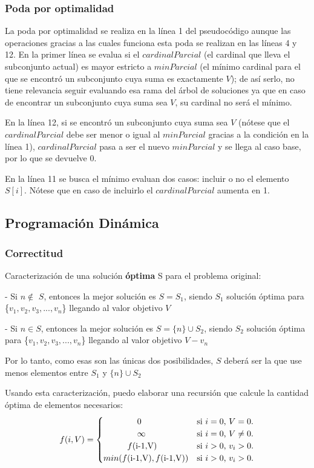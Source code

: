 \subsubsection{Poda por optimalidad}
\par La poda por optimalidad se realiza en la l\'inea 1 del pseudoc\'odigo aunque las operaciones gracias a las
cuales funciona esta poda se realizan en las l\'ineas 4 y 12. En la primer l\'inea se evalua si el $cardinalParcial$
(el cardinal que lleva el subconjunto actual) es mayor estricto a $minParcial$ (el m\'inimo cardinal para el que
se encontr\'o un subconjunto cuya suma es exactamente $V$); de as\'i serlo, no tiene relevancia seguir evaluando
esa rama del \'arbol de soluciones ya que en caso de encontrar un subconjunto cuya suma sea $V$, su cardinal no ser\'a
el m\'inimo.
\par En la l\'inea 12, si se encontr\'o un subconjunto cuya suma sea $V$ (n\'otese que el $cardinalParcial$ debe
ser menor o igual al $minParcial$ gracias a la condici\'on en la l\'inea 1), $cardinalParcial$ pasa a ser el nuevo
$minParcial$ y se llega al caso base, por lo que se devuelve 0.
\par En la l\'inea 11 se busca el m\'inimo evaluan dos casos: incluir o no el elemento $S[i]$. N\'otese que en caso
de incluirlo el $cardinalParcial$ aumenta en 1.

\subsection{Programaci\'on Din\'amica}
\subsubsection{Correctitud}
Caracterizaci\'on de una solución \textbf{óptima} S para el problema original:
\par - Si $n \not\in$ $S$, entonces la mejor solución es $S =S_1$, siendo $S_1$ solución
óptima para \{$v_1 , v_2 , v_3 ,..., v_{n}$\} llegando al valor objetivo $V$
\par - Si $n \in S$, entonces la mejor solución es $S = \{n\} \cup S_2$, siendo $S_2$
solución óptima para \{$v_1 , v_2 , v_3 ,..., v_{n}$\} llegando al valor objetivo $V - v_n$
\par Por lo tanto, como esas son las únicas dos posibilidades, $S$ deberá ser la que use menos elementos entre 
$S_1$ y $\{n\} \cup S_2$
\par Usando esta caracterización, puedo elaborar una recursión
que calcule la cantidad óptima de elementos necesarios:
\begin{equation*}
  f(i,V)=\begin{cases}
    $\qquad\qquad$0 & \text{si $i=0$, $V=0$}.\\
    $\qquad\qquad$\infty & \text{si $i=0$, $V\neq 0$}.\\
    $\qquad\;\;\;$f($i$ $-$ $1$,$V$) & \text{si $i> 0$, $v_i > 0$}.\\
    min (f($i$ $-$ $1$,$V$),f($i$ $-$ $1$,$V$)) & \text{si $i> 0$, $v_i > 0$}.\\
  \end{cases}
\end{equation*}
